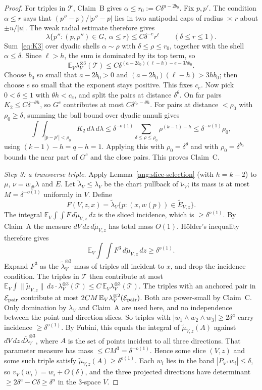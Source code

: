 \begin{proof}
For triples in $\mathcal T$, Claim~B gives $\alpha\le r_0:=C\delta^{a-2b_0}$. Fix $p,p'$. The condition $\alpha\le r$ says that $(p''-p)/|p''-p|$ lies in two antipodal caps of radius $\asymp r$ about $\pm u/|u|$. The weak radial estimate therefore gives
\[
 \lambda\{p'':(p,p'')\in G,\ \alpha\le r\}\le C\delta^{-e}r^\ell\qquad(\delta\le r\le1).
\]
Sum~\eqref{eq:K3} over dyadic shells $\alpha\sim\rho$ with $\delta\le\rho\le r_0$, together with the shell $\alpha\le\delta$. Since $\ell>h$, the sum is dominated by its top term, so
\[
 \mathbb E_V\lambda_V^{\otimes3}(\mathcal T)\le C\delta^{(a-2b_0)(\ell-h)-e-3hb_0}.
\]
Choose $b_0$ so small that $a-2b_0>0$ and $(a-2b_0)(\ell-h)>3hb_0$; then choose $e$ so small that the exponent stays positive. This fixes $c_e$. Now pick $0<\theta\le1$ with $\theta h<c_e$, and split the pairs at distance $\delta^\theta$. On far pairs $K_2\le C\delta^{-\theta h}$, so $G^c$ contributes at most $C\delta^{c_e-\theta h}$. For pairs at distance $<\rho_0$ with $\rho_0\ge\delta$, summing the ball bound over dyadic annuli gives
\[
 \int\!\!\int_{|p-p'|<\rho_0}K_2\,d\lambda\,d\lambda\le\delta^{-o(1)}\sum_{\delta\le\rho\le\rho_0}\rho^{(k-1)-h}\le\delta^{-o(1)}\rho_0,
\]
using $(k-1)-h=q-h=1$. Applying this with $\rho_0=\delta^\theta$ and with $\rho_0=\delta^{b_0}$ bounds the near part of $G^c$ and the close pairs. This proves Claim~C.

\emph{Step 3: a transverse triple.} Apply Lemma~\ref{ang:slice-selection} (with $h=k-2$) to $\mu$, $\nu=w_\#\lambda$ and $E$. Let $\widetilde\lambda_V\le\lambda_V$ be the chart pullback of $\widetilde\nu_V$; its mass is at most $M=\delta^{-o(1)}$ uniformly in $V$. Define
\[
 F(V,z,x)=\widetilde\lambda_V\{p:(x,w(p))\in\widetilde E_{V,z}\}.
\]
The integral $\mathbb E_V\!\int\!\!\int F\,d\widetilde\mu_{V,z}\,dz$ is the sliced incidence, which is $\ge\delta^{o(1)}$. By Claim~A the measure $dV\,dz\,d\widetilde\mu_{V,z}$ has total mass $O(1)$. Hölder's inequality therefore gives
\[
 \mathbb E_V\int\!\!\int F^3\,d\widetilde\mu_{V,z}\,dz\ge\delta^{o(1)}.
\]
Expand $F^3$ as the $\widetilde\lambda_V^{\otimes3}$-mass of triples all incident to $x$, and drop the incidence condition. The triples in $\mathcal T$ then contribute at most $\mathbb E_V\int\|\widetilde\mu_{V,z}\|\,dz\cdot\lambda_V^{\otimes3}(\mathcal T)\le C\,\mathbb E_V\lambda_V^{\otimes3}(\mathcal T)$. The triples with an anchored pair in $\mathcal E_{\rm pair}$ contribute at most $2CM\,\mathbb E_V\lambda_V^{\otimes2}(\mathcal E_{\rm pair})$. Both are power-small by Claim~C. Only domination by $\lambda_V$ and Claim~A are used here, and no independence between the point and direction slices. So triples with $|w_1\wedge w_2\wedge w_3|\ge2\delta^a$ carry incidence $\ge\delta^{o(1)}$. By Fubini, this equals the integral of $\widetilde\mu_{V,z}(A)$ against $dV\,dz\,d\widetilde\lambda_V^{\otimes3}$, where $A$ is the set of points incident to all three directions. That parameter measure has mass $\le CM^3=\delta^{-o(1)}$. Hence some slice $(V,z)$ and some such triple satisfy $\widetilde\mu_{V,z}(A)\ge\delta^{o(1)}$. Each $w_i$ lies in the band $|P_{V^\perp}w_i|\le\delta$, so $v_V(w_i)=w_i+O(\delta)$, and the three projected directions have determinant $\ge2\delta^a-C\delta\ge\delta^a$ in the $3$-space $V$.


\end{proof}
